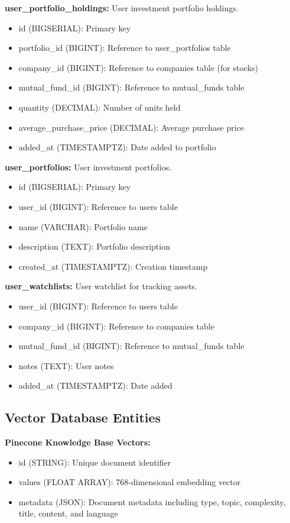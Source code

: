 \documentclass[12pt,a4paper]{report}
\begin{document}
\textbf{user\_portfolio\_holdings:} User investment portfolio holdings.
\begin{itemize}
    \item id (BIGSERIAL): Primary key
    \item portfolio\_id (BIGINT): Reference to user\_portfolios table
    \item company\_id (BIGINT): Reference to companies table (for stocks)
    \item mutual\_fund\_id (BIGINT): Reference to mutual\_funds table
    \item quantity (DECIMAL): Number of units held
    \item average\_purchase\_price (DECIMAL): Average purchase price
    \item added\_at (TIMESTAMPTZ): Date added to portfolio
\end{itemize}

\textbf{user\_portfolios:} User investment portfolios.
\begin{itemize}
    \item id (BIGSERIAL): Primary key
    \item user\_id (BIGINT): Reference to users table
    \item name (VARCHAR): Portfolio name
    \item description (TEXT): Portfolio description
    \item created\_at (TIMESTAMPTZ): Creation timestamp
\end{itemize}

\textbf{user\_watchlists:} User watchlist for tracking assets.
\begin{itemize}
    \item user\_id (BIGINT): Reference to users table
    \item company\_id (BIGINT): Reference to companies table
    \item mutual\_fund\_id (BIGINT): Reference to mutual\_funds table
    \item notes (TEXT): User notes
    \item added\_at (TIMESTAMPTZ): Date added
\end{itemize}

\subsection{Vector Database Entities}

\textbf{Pinecone Knowledge Base Vectors:}
\begin{itemize}
    \item id (STRING): Unique document identifier
    \item values (FLOAT ARRAY): 768-dimensional embedding vector
    \item metadata (JSON): Document metadata including type, topic, complexity, title, content, and language
\end{itemize}
\end{document}
